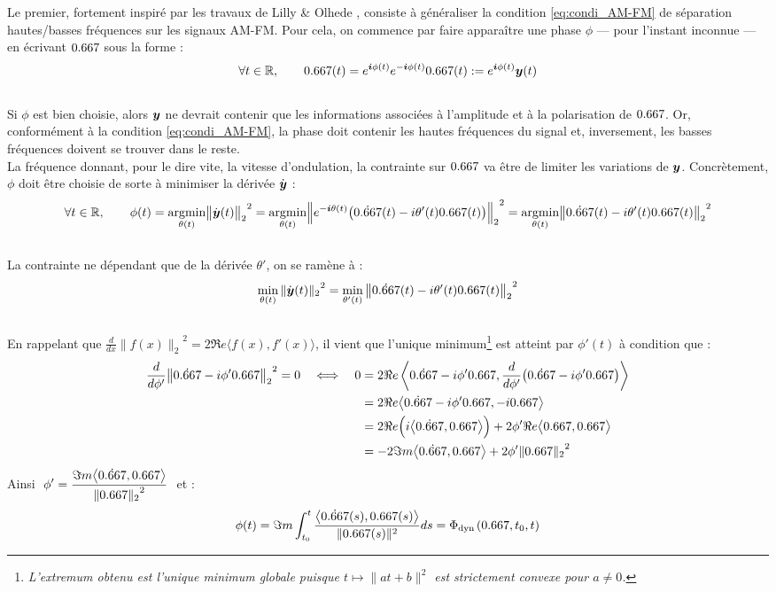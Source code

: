 Le premier, fortement inspiré par les travaux de Lilly \& Olhede  \cite{lilly_analysis_2012}, consiste à généraliser la condition \eqref{eq:condi_AM-FM} de séparation hautes/basses fréquences sur les signaux AM-FM.
Pour cela, on commence par faire apparaître une phase $\phi$ --- pour l'instant inconnue --- en écrivant $\x$ sous la forme :
\[\forall t\in\R,\qquad \x(t) = e^{\i \phi(t)} e^{-\i \phi(t)} \x(t) \defeq e^{\i \phi(t)} \bf{y}(t)\]
\\
Si $\phi$ est bien choisie, alors $\bf{y}$ ne devrait contenir que les informations associées à l'amplitude et à la polarisation de $\x$. Or, conformément à la condition \eqref{eq:condi_AM-FM}, la phase doit contenir les hautes fréquences du signal et, inversement, les basses fréquences doivent se trouver dans le reste. 
\\
La fréquence donnant, pour le dire vite, la vitesse d'ondulation, la contrainte sur $\x$ va être de limiter les variations de  $\bf{y}$. Concrètement, $\phi$ doit être choisie de sorte à minimiser la dérivée $\dot{\bf{y}}$ :
\[\forall t\in\R,\qquad \phi(t) = \argmin{\theta(t)}{\big\|\dot{\bf{y}}(t)\big\|_2}^2 = \argmin{\theta(t)}{\Big\|e^{-\i \theta(t)}\big(\dot{\x}(t) - i\theta'(t) \x(t)\big) \Big\|_2}^2 = \argmin{\theta(t)}{\big\|\dot{\x}(t) - i\theta'(t)\x(t)\big\|_2}^2\]
\\
La contrainte ne dépendant que de la dérivée $\theta'$, on se ramène à :
\[\min_{\theta(t)}{\|\dot{\bf{y}}(t)\|_2}^2 = \min_{\theta'(t)}{\big\|\dot{\x}(t) - i\theta'(t) \x(t)\big\|_2}^2\]
\\
En rappelant que $\frac{d}{dx}{\big\|f(x)\big\|_2}^2 = 2\Re e\big\langle f(x), f'(x)\big\rangle$, il vient que l'unique minimum\footnote{\itshape
	L'extremum obtenu est l'unique minimum globale puisque $t\longmapsto \|at + b\|^2$ est strictement convexe pour $a\neq0$.}
est atteint par $\phi'(t)$ à condition que :
\begin{align*}
	\frac{d}{d\phi'}{\big\| \dot{\x} - i\phi' \x\big\|_2}^2 = 0 \quad \Llr\quad
	0 &= 2\Re e\left\langle  \dot{\x} - i\phi' \x ,  \frac{d}{d\phi'}\big(\dot{\x} - i\phi' \x\big)\right\rangle \\
	&= 2\Re e\big\langle  \dot{\x} - i\phi' \x ,  - i \x\big\rangle \\
	&= 2\Re e\Big(i\big\langle  \dot{\x} ,  \x\big\rangle\Big) + 2\phi'\Re e\big\langle   \x ,  \x\big\rangle\\
	&= -2\Im m\big\langle  \dot{\x} ,  \x\big\rangle + 2\phi'{\| \x\|_2}^2
\end{align*}
Ainsi $\displaystyle \ \phi' = \frac{\Im m\big\langle  \dot{\x} ,  \x\big\rangle}{{\| \x\|_2}^2}\ $ et :
\begin{equation}\label{eq:phas_inst_v1}
  \phi(t) = \Im m\int_{t_0}^t \frac{\big\langle \dot{\x}(s) , \x(s) \big\rangle}{\|\x(s)\|^2} ds = \phased(\x,t_0,t)
\end{equation}
\skipl




